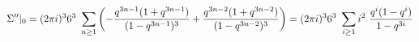 \begin{equation}
\Sigma''|_0 =(2\pi i)^3 6^3 ~\sum_{n\geq 1} \left(
-{q^{3n-1}(1+q^{3n-1}) \over (1-q^{3n-1})^3} + {q^{3n-2}(1+q^{3n-2})
  \over (1-q^{3n-2})^3} \right) 
= (2\pi i)^3 6^3 ~\sum_{i\geq 1} i^2 ~{q^i(1-q^i) \over 1-q^{3i}}
\end{equation}


